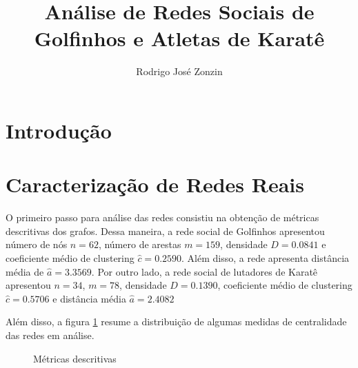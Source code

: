 \documentclass[12pt]{article}
\title{Análise de Redes Sociais de Golfinhos e Atletas de Karatê}
\author{Rodrigo José Zonzin \inst{1} }
\begin{document}
 

\maketitle


\section{Introdução}
\section{Caracterização de Redes Reais}
O primeiro passo para análise das redes consistiu na obtenção de métricas descritivas dos grafos. Dessa maneira, a rede social de Golfinhos apresentou número de nós  $n = 62$, número de arestas $m = 159$, densidade  $D = 0.0841$ e coeficiente médio de clustering $\hat{c} = 0.2590$. Além disso, a rede apresenta distância média de $\hat{a} = 3.3569$. Por outro lado, a rede social de lutadores de Karatê apresentou $n = 34$, $m = 78$, densidade $D = 0.1390$, coeficiente médio de clustering $\hat{c} = 0.5706$ e distância média $\hat{a} = 2.4082$

Além disso, a figura \ref{metricas} resume a distribuição de algumas medidas de centralidade das redes em análise.  

\begin{figure}[h!]
    \centering
    \qquad
    
    \caption{Métricas descritivas}
    \label{metricas}
\end{figure}
\end{document}
